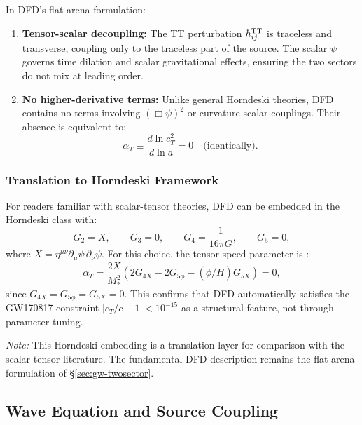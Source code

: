 In DFD's flat-arena formulation:
\begin{enumerate}
\item \textbf{Tensor-scalar decoupling:} The TT perturbation $h_{ij}^{\rm TT}$ is traceless and transverse, coupling only to the traceless part of the source. The scalar $\psi$ governs time dilation and scalar gravitational effects, ensuring the two sectors do not mix at leading order.

\item \textbf{No higher-derivative terms:} Unlike general Horndeski theories, DFD contains no terms involving $(\Box\psi)^2$ or curvature-scalar couplings. Their absence is equivalent to:
\begin{equation}
\alpha_T \equiv \frac{d\ln c_T^2}{d\ln a} = 0 \quad \text{(identically)}.
\end{equation}
\end{enumerate}

\subsubsection{Translation to Horndeski Framework}

For readers familiar with scalar-tensor theories, DFD can be embedded in the Horndeski class with:
\begin{equation}
G_2 = X, \qquad G_3 = 0, \qquad G_4 = \frac{1}{16\pi G}, \qquad G_5 = 0,
\end{equation}
where $X = \eta^{\mu\nu}\partial_\mu\psi\,\partial_\nu\psi$. For this choice, the tensor speed parameter is \cite{Bellini2014}:
\begin{equation}
\alpha_T = \frac{2X}{M_*^2}(2G_{4X} - 2G_{5\phi} - (\ddot{\phi}/H)G_{5X}) = 0,
\end{equation}
since $G_{4X} = G_{5\phi} = G_{5X} = 0$. This confirms that DFD automatically satisfies the GW170817 constraint $|c_T/c - 1| < 10^{-15}$ as a structural feature, not through parameter tuning.

\textit{Note:} This Horndeski embedding is a translation layer for comparison with the scalar-tensor literature. The fundamental DFD description remains the flat-arena formulation of \S\ref{sec:gw-twosector}.

\subsection{Wave Equation and Source Coupling}\label{sec:gw-wave-eq}

